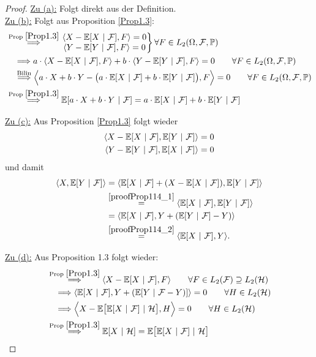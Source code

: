\begin{proof}
\underline{Zu (a):} Folgt direkt aus der Definition.\\

\underline{Zu (b):} Folgt aus Proposition \ref{Prop1.3}:
\begin{align*}
&\stackrel{\text{Prop }\ref{Prop1.3}}{\Longrightarrow}
\left.
\begin{matrix}
\langle X-\mathbb{E}[X~|~\mathcal{F}],F\rangle=0\\
\langle Y-\mathbb{E}[Y~|~\mathcal{F}],F\rangle=0
\end{matrix}
\right\rbrace\forall F\in L_2(\Omega,\mathcal{F},\mathbb{P})\\
&~~~\Longrightarrow
a\cdot\langle X-\mathbb{E}[X~|~\mathcal{F}],F\rangle+b\cdot\langle Y-\mathbb{E}[Y~|~\mathcal{F}],F\rangle=0\qquad\forall F\in L_2(\Omega,\mathcal{F},\mathbb{P})\\
&~~~\stackrel{\text{Bilin}}{\Longrightarrow}
\Big\langle a\cdot X+b\cdot Y-\big(a\cdot\mathbb{E}[X~|~\mathcal{F}]+b\cdot \mathbb{E}[Y~|~\mathcal{F}]\big),F\Big\rangle=0\qquad\forall F\in L_2(\Omega,\mathcal{F},\mathbb{P})\\
&\stackrel{\text{Prop }\ref{Prop1.3}}{\Longrightarrow}
\mathbb{E}[a\cdot X+b\cdot Y~|~\mathcal{F}]=a\cdot \mathbb{E}[X~|~\mathcal{F}]+b\cdot \mathbb{E}[Y~|~\mathcal{F}]
\end{align*}

\underline{Zu (c):} Aus Proposition \ref{Prop1.3} folgt wieder
\begin{align}
\langle X-\mathbb{E}[X~|~\mathcal{F}],\mathbb{E}[Y~|~\mathcal{F}]\rangle=0\label{proofProp114_1}\\
\langle Y-\mathbb{E}[Y~|~\mathcal{F}],\mathbb{E}[X~|~\mathcal{F}]\rangle=0\label{proofProp114_2}
\end{align}
und damit
\begin{align*}
\langle X,\mathbb{E}[Y~|~\mathcal{F}]\rangle
&=\langle \mathbb{E}[X~|~\mathcal{F}]+(X-\mathbb{E}[X~|~\mathcal{F}]),\mathbb{E}[Y~|~\mathcal{F}]\rangle\\
&\stackrel{\ref{proofProp114_1}}{=}
\langle\mathbb{E}[X~|~\mathcal{F}],\mathbb{E}[Y~|~\mathcal{F}]\rangle\\
&=\langle\mathbb{E}[X~|~\mathcal{F}],Y+(\mathbb{E}[Y~|~\mathcal{F}]-Y)\rangle\\
&\stackrel{\ref{proofProp114_2}}{=}
\langle\mathbb{E}[X~|~\mathcal{F}],Y\rangle.
\end{align*}

\underline{Zu (d):} 
Aus Proposition 1.3 folgt wieder:
\begin{align*}
&\stackrel{\text{Prop }\ref{Prop1.3}}{\Longrightarrow}
\langle X-\mathbb{E}[X~|~\mathcal{F}],F\rangle\qquad\forall F\in L_2(\mathcal{F})\supseteq L_2(\mathcal{H})\\
&~~~\Longrightarrow
\langle \mathbb{E}[X~|~\mathcal{F}],Y+(\mathbb{E}[Y~|~\mathcal{F}-Y)]\rangle=0\qquad\forall H\in L_2(\mathcal{H})\\
&~~~\Longrightarrow
\Big\langle X-\mathbb{E}\big[\mathbb{E}[X~|~\mathcal{F}]~|~\mathcal{H}\big],H\Big\rangle=0\qquad\forall H\in L_2(\mathcal{H})\\
&\stackrel{\text{Prop }\ref{Prop1.3}}{\Longrightarrow}
\mathbb{E}[X~|~\mathcal{H}]=\mathbb{E}\big[\mathbb{E}[X~|~\mathcal{F}]~|~\mathcal{H}\big]
\end{align*}


\end{proof}
